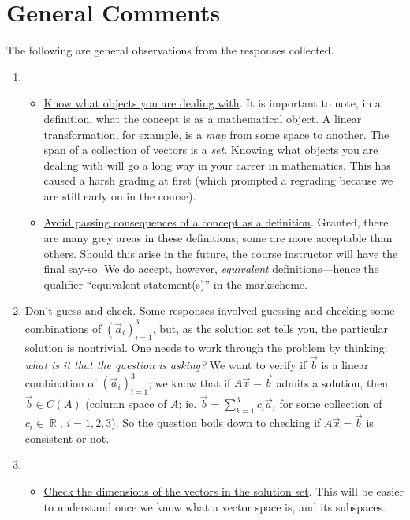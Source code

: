 \documentclass[answers,11pt]{exam}
\theoremstyle{definition}
\theoremstyle{definition}
\DeclareMathOperator{\R}{\mathbb{R}}
\DeclareMathOperator{\1}{\mathbbm{1}}
\begin{document}
\clearpage


\section*{General Comments}
The following are general observations from the responses collected.


\begin{enumerate}
	\item \begin{itemize}
		
		\item \uline{Know what objects you are dealing with}. It is important to note, in a definition, what the concept is as a mathematical object. A linear transformation, for example, is a \textit{map} from some space to another. The span of a collection of vectors is a \textit{set}. Knowing what objects you are dealing with will go a long way in your career in mathematics. This has caused a harsh grading at first (which prompted a regrading because we are still early on in the course).
		
		\item \uline{Avoid passing consequences of a concept as a definition}. Granted, there are many grey areas in these definitions; some are more acceptable than others. Should this arise in the future, the course instructor will have the final say-so. We do accept, however, \textit{equivalent} definitions---hence the qualifier ``equivalent statement(s)'' in the markscheme.
	\end{itemize}
	
	
	\item \uline{Don't guess and check}. Some responses involved guessing and checking some combinations of $(\vec{a}_i)_{i=1}^{3}$, but, as the solution set tells you, the particular solution is nontrivial. One needs to work through the problem by thinking: \textit{what is it that the question is asking?} We want to verify if $\vec{b}$ is a linear combination of $(\vec{a}_i)_{i=1}^{3}$; we know that if $A\vec{x} = \vec{b}$ admits a solution, then $\vec{b} \in C(A)$ (column space of $A$; ie. $\vec{b} = \sum_{k=1}^{3} c_i \vec{a}_i$ for some collection of $c_i \in \R$, $i=1,2,3$). So the question boils down to checking if $A\vec{x} = \vec{b}$ is consistent or not.
	
	
	\item \begin{itemize}
		\item \uline{Check the dimensions of the vectors in the solution set}. This will be easier to understand once we know what a vector space is, and its subspaces.
		

\end{itemize}
\end{enumerate}
\end{document}
